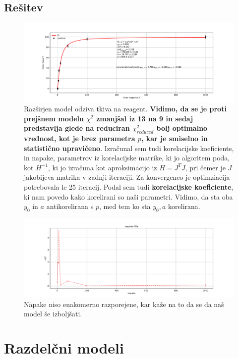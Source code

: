 \documentclass[11pt, a4paper]{article}
\begin{document}
\subsection{Rešitev}
 \begin{figure}[H]
\hspace*{-2.5cm}  
  \includegraphics[width=20cm]{prva_fit.pdf}
 \caption{Razširjen model odziva tkiva na reagent. \textbf{Vidimo, da se je proti prejšnem modelu $\chi^2$ zmanjšal iz 13 na 9 in sedaj predstavlja glede na reduciran $\chi_{reduced}^2$ bolj optimalno vrednost, kot je brez parametra $p$, kar je smiselno in statistično upravičeno}. Izračunal sem tudi korelacijske koeficiente, in napake, parametrov iz korelacijske matrike, ki jo algoritem poda, kot $H^{-1}$, ki jo izračuna kot aproksimacijo iz $H = J^TJ$, pri čemer je $J$ jakobijeva matrika v zadnji iteraciji. Za konvergenco je optimziacija potrebovala le 25 iteracij. Podal sem tudi \textbf{korelacijske koeficiente}, ki nam povedo kako korelirani so naši parametri. Vidimo, da sta oba $y_0$ in $a$ antikorelirana s $p$, med tem ko sta $y_0,a$ korelirana.}
\end{figure}
\begin{figure}[H]
\hspace*{-2.5cm}  
  \includegraphics[width=20cm]{prva_napaka.pdf}
 \caption{Napake niso enakomerno razporejene, kar kaže na to da se da naš model še izboljšati.}
\end{figure}

\section{Razdelčni modeli}
\end{document}
